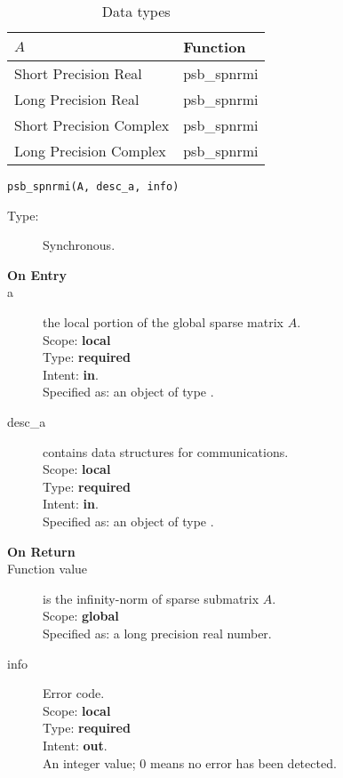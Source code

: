 \begin{table}[h]
\begin{center}
\begin{tabular}{ll}
\hline
$A$ & {\bf Function}\\
\hline
Short Precision Real & psb\_spnrmi \\
Long Precision Real & psb\_spnrmi \\
Short Precision Complex & psb\_spnrmi \\
Long Precision Complex & psb\_spnrmi \\
\hline
\end{tabular}
\end{center}
\caption{Data types\label{tab:f90nrmi}}
\end{table}

\begin{verbatim}
psb_spnrmi(A, desc_a, info)
\end{verbatim}

\begin{description}
\item[Type:] Synchronous.
\item[\bf On Entry]
\item[a] the local  portion of the global sparse matrix
$A$. \\   
Scope: {\bf local} \\
Type: {\bf required}\\
Intent: {\bf in}.\\
Specified as: an object of type \spdata.
\item[desc\_a] contains data structures for communications.\\
Scope: {\bf local} \\
Type: {\bf required}\\
Intent: {\bf in}.\\
Specified as: an object of type \descdata.
\item[\bf On Return] 
\item[Function value] is the infinity-norm of sparse submatrix $A$.\\
Scope: {\bf global} \\
Specified as: a long precision real number.
\item[info] Error code.\\
Scope: {\bf local} \\
Type: {\bf required} \\
Intent: {\bf out}.\\
An integer value; 0 means no error has been detected. 
\end{description}


